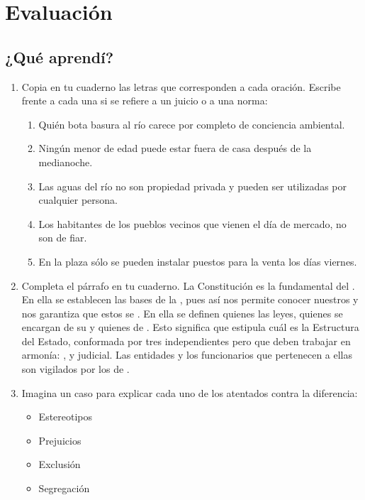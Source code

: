 \documentclass[10pt,twoside]{article}
\begin{document}
\section*{Evaluaci\'{o}n}
\subsection*{¿Qu\'{e} aprend\'{i}?}
\begin{enumerate}
\item Copia en tu cuaderno las letras que corresponden a cada
oración. Escribe frente a cada una si se refiere a un juicio o a una norma:
\begin{enumerate}
\item Quién bota basura al río carece por completo de conciencia ambiental.
\item Ningún menor de edad puede estar fuera de casa después
de la medianoche.
\item Las aguas del río no son propiedad privada y pueden ser
utilizadas por cualquier persona.
\item Los habitantes de los pueblos vecinos que vienen el día de mercado, no son de fiar.
\item En la plaza sólo se pueden instalar puestos para la venta los días viernes.
\end{enumerate}
\item Completa el párrafo en tu cuaderno.
La Constitución es la \underline{\hspace*{1cm}} fundamental del \underline{\hspace*{1.5cm}}. En ella se establecen las bases de la \underline{\hspace*{1.5cm}}, pues así nos permite conocer nuestros \underline{\hspace*{1.5cm}} y nos garantiza que estos se \underline{\hspace*{1.5cm}}. En ella se definen quienes \underline{\hspace*{1.5cm}} las leyes, quienes se encargan de su \underline{\hspace*{2cm}} y quienes de \underline{\hspace*{2cm}}. Esto significa que estipula cuál es la Estructura del Estado, conformada por tres \underline{\hspace*{1.5cm}} independientes pero que deben trabajar en armonía: \underline{\hspace*{2cm}}, \underline{\hspace*{2cm}} y judicial. Las entidades y los funcionarios que pertenecen a ellas son vigilados por los \underline{\hspace*{2cm}} de \underline{\hspace*{2cm}}.
\item Imagina un caso para explicar cada uno de los atentados
contra la diferencia:
\begin{multicols}{2}
\begin{itemize}
\item Estereotipos
\item Prejuicios
\item Exclusión
\item Segregación
\end{itemize}
\end{multicols}

\end{enumerate}
\end{document}
